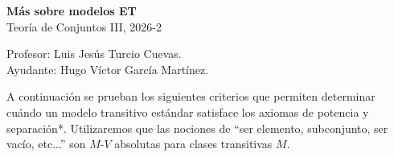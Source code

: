 \documentclass[letterpaper,DIV=15,12pt]{scrartcl}
\theoremstyle{manual}
\begin{document}
\thispagestyle{plain}

    \begin{center}
        {\fontsize{30}{60}\rmfamily \textbf{Más sobre modelos ET}} \\ \vspace{.2cm} Teoría de Conjuntos III, 2026-2
    \end{center}
    \begin{flushright}
        \footnotesize \hfill Profesor: Luis Jesús Turcio Cuevas.\\
        \hfill Ayudante: Hugo Víctor García Martínez.
    \end{flushright}

    A continuación se prueban los siguientes criterios que permiten determinar cuándo un modelo transitivo estándar satisface los axiomas de potencia y separación*. Utilizaremos que las nociones de ``ser elemento, subconjunto, ser vacío, etc...'' son $M$-$V$ absolutas para clases transitivas $M$.
    
\end{document}

